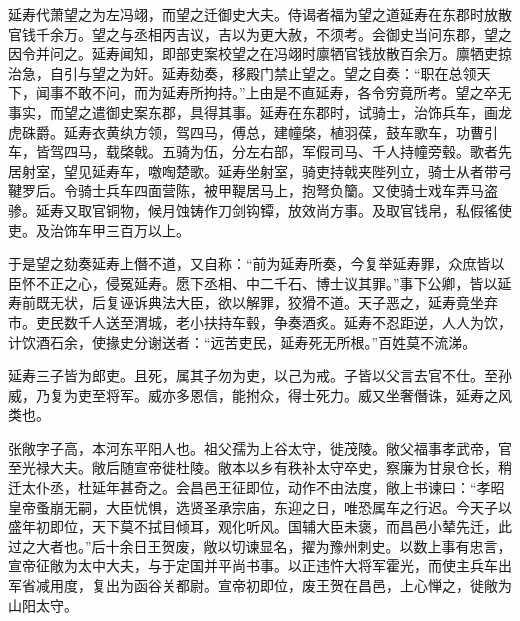 \documentclass[12pt,UTF8]{ctexbook}
\begin{document}
延寿代萧望之为左冯翊，而望之迁御史大夫。侍谒者福为望之道延寿在东郡时放散官钱千余万。望之与丞相丙吉议，吉以为更大赦，不须考。会御史当问东郡，望之因令并问之。延寿闻知，即部吏案校望之在冯翊时廪牺官钱放散百余万。廪牺吏掠治急，自引与望之为奸。延寿劾奏，移殿门禁止望之。望之自奏：“职在总领天下，闻事不敢不问，而为延寿所拘持。”上由是不直延寿，各令穷竟所考。望之卒无事实，而望之遣御史案东郡，具得其事。延寿在东郡时，试骑士，治饰兵车，画龙虎硃爵。延寿衣黄纨方领，驾四马，傅总，建幢棨，植羽葆，鼓车歌车，功曹引车，皆驾四马，载棨戟。五骑为伍，分左右部，军假司马、千人持幢旁毂。歌者先居射室，望见延寿车，噭啕楚歌。延寿坐射室，骑吏持戟夹陛列立，骑士从者带弓鞬罗后。令骑士兵车四面营陈，被甲鞮居马上，抱弩负籣。又使骑士戏车弄马盗骖。延寿又取官铜物，候月蚀铸作刀剑钩镡，放效尚方事。及取官钱帛，私假徭使吏。及治饰车甲三百万以上。



于是望之劾奏延寿上僭不道，又自称：“前为延寿所奏，今复举延寿罪，众庶皆以臣怀不正之心，侵冤延寿。愿下丞相、中二千石、博士议其罪。”事下公卿，皆以延寿前既无状，后复诬诉典法大臣，欲以解罪，狡猾不道。天子恶之，延寿竟坐弃市。吏民数千人送至渭城，老小扶持车毂，争奏酒炙。延寿不忍距逆，人人为饮，计饮酒石余，使掾史分谢送者：“远苦吏民，延寿死无所根。”百姓莫不流涕。



延寿三子皆为郎吏。且死，属其子勿为吏，以己为戒。子皆以父言去官不仕。至孙威，乃复为吏至将军。威亦多恩信，能拊众，得士死力。威又坐奢僭诛，延寿之风类也。



张敞字子高，本河东平阳人也。祖父孺为上谷太守，徙茂陵。敞父福事孝武帝，官至光禄大夫。敞后随宣帝徙杜陵。敞本以乡有秩补太守卒史，察廉为甘泉仓长，稍迁太仆丞，杜延年甚奇之。会昌邑王征即位，动作不由法度，敞上书谏曰：“孝昭皇帝蚤崩无嗣，大臣忧惧，选贤圣承宗庙，东迎之日，唯恐属车之行迟。今天子以盛年初即位，天下莫不拭目倾耳，观化听风。国辅大臣未褒，而昌邑小辇先迁，此过之大者也。”后十余日王贺废，敞以切谏显名，擢为豫州刺史。以数上事有忠言，宣帝征敞为太中大夫，与于定国并平尚书事。以正违忤大将军霍光，而使主兵车出军省减用度，复出为函谷关都尉。宣帝初即位，废王贺在昌邑，上心惮之，徙敞为山阳太守。
\end{document}
